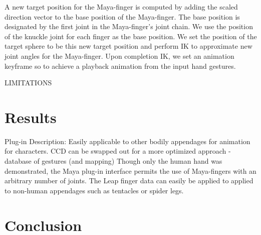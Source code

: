 \documentclass[review]{acmsiggraph}
\begin{document}
A new target position for the Maya-finger is computed by adding the scaled direction vector to the base position of the Maya-finger. The base position is designated by the first joint in the Maya-finger's joint chain. We use the position of the knuckle joint for each finger as the base position. We set the position of the target sphere to be this new target position and perform IK to approximate new joint angles for the Maya-finger. Upon completion IK, we set an animation keyframe so to achieve a playback animation from the input hand gestures.




LIMITATIONS


%


\section{Results}

Plug-in Description:
Easily applicable to other bodily appendages for animation for characters. CCD can be swapped out for a more optimized approach - database of gestures (and mapping)
Though only the human hand was demonstrated, the Maya plug-in interface permits the use of Maya-fingers with an arbitrary number of joints. The Leap finger data can easily be applied to applied to non-human appendages such as tentacles or spider legs. 

\section{Conclusion}





\end{document}
